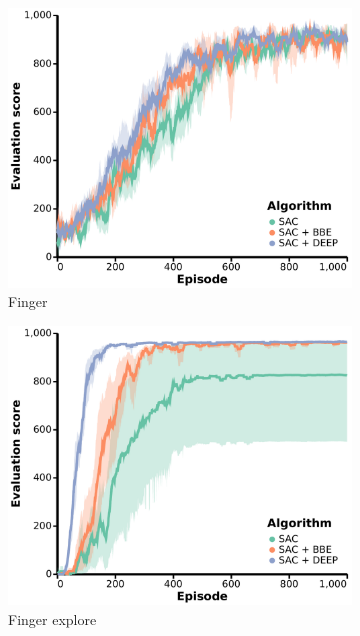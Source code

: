 \begin{figure}[ht]
    \begin{subfigure}[b]{0.24\textwidth}
        \centering
        \includegraphics[width=\textwidth]{figures/deep/neurips_finger.pdf}
        \caption{Finger}
    \end{subfigure}
    \begin{subfigure}[b]{0.24\textwidth}
        \centering
        \includegraphics[width=\textwidth]{figures/deep/neurips_finger_explore.pdf}
        \caption{Finger explore}
    \end{subfigure}
    \hfill
    \begin{subfigure}[b]{0.24\textwidth}

\end{subfigure}
\end{figure}
